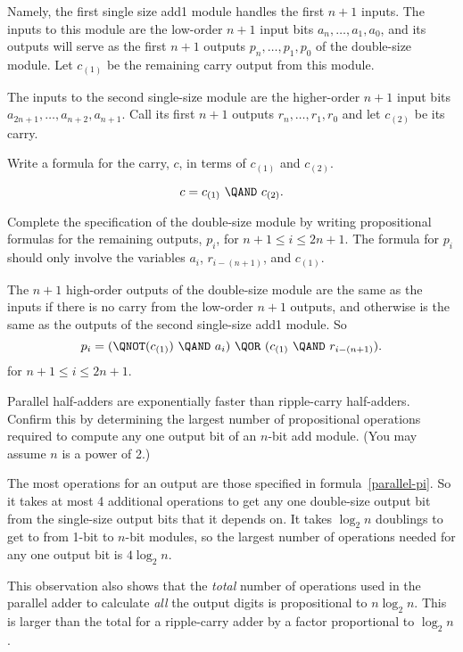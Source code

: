 \documentclass[handout]{mcs}
\begin{document}
\begin{problem}
Namely, the first single size add1 module handles the first $n+1$ inputs.
The inputs to this module are the low-order $n+1$ input bits $a_n,\dots,
a_1, a_0$, and its outputs will serve as the first $n+1$ outputs $p_n,
\dots, p_1, p_0$ of the double-size module.  Let $c_{(1)}$ be the
remaining carry output from this module.

The inputs to the second single-size module are the higher-order $n+1$
input bits $a_{2n+1}, \dots, a_{n+2}, a_{n+1}$.  Call its first $n+1$
outputs $r_n, \dots, r_1, r_0$ and let $c_{(2)}$ be its carry.

\bparts

\ppart Write a formula for the carry, $c$, in terms of $c_{(1)}$ and
$c_{(2)}$.

\begin{solution}

\[
c = c_{(1)}\ \QAND\ c_{(2)}.
\]

\end{solution}

\ppart Complete the specification of the double-size module by writing
propositional formulas for the remaining outputs, $p_i$, for $n+1 \leq i
\leq 2n+1$.  The formula for $p_i$ should only involve the variables
$a_i$, $r_{i-(n+1)}$, and $c_{(1)}$.

\begin{solution}
 The $n+1$ high-order outputs of the double-size module are the
  same as the inputs if there is no carry from the low-order $n+1$
  outputs, and otherwise is the same as the outputs of the second
  single-size add1 module.  So
\begin{equation}\label{parallel-pi}
p_i = (\QNOT(c_{(1)})\ \QAND\ a_i)\ \QOR\ (c_{(1)}\ \QAND\ r_{i-(n+1)}).
\end{equation}
for $n+1 \leq i \leq 2n+1$.
\end{solution}

\ppart Parallel half-adders are exponentially faster than ripple-carry
half-adders.  Confirm this by determining the largest number of
propositional operations required to compute any one output bit of an
$n$-bit add module.  (You may assume $n$ is a power of 2.)

\begin{solution}
 The most operations for an output are those specified in
  formula~\eqref{parallel-pi}.  So it takes at most 4 additional
  operations to get any one double-size output bit from the single-size
  output bits that it depends on.  It takes $\log_2 n$ doublings to get to
  from 1-bit to $n$-bit modules, so the largest number of operations
  needed for any one output bit is $4 \log_2 n$.

This observation also shows that the \emph{total} number of operations
used in the parallel adder to calculate \emph{all} the output digits is
propositional to $ n \log_2 n$.  This is larger than the total for a
ripple-carry adder by a factor proportional to $\log_2 n$.
\end{solution}

\eparts

\end{problem}


\end{document}
